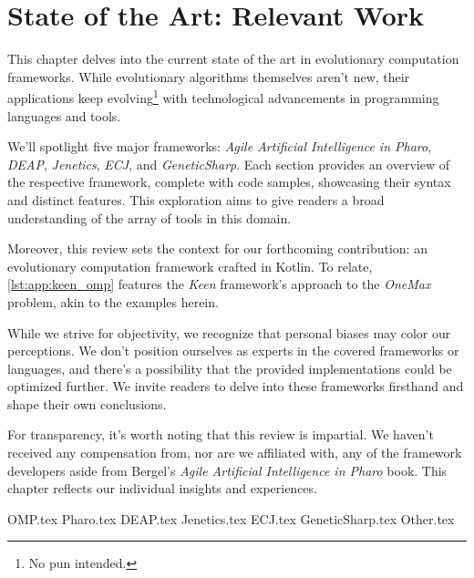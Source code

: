 \chapter{State of the Art: Relevant Work}
\label{chap:sota}
  This chapter delves into the current state of the art in evolutionary 
  computation frameworks.
  While evolutionary algorithms themselves aren't new, their applications keep 
  evolving\footnote{No pun intended.} with technological advancements in 
  programming languages and tools.

  We'll spotlight five major frameworks: \emph{Agile Artificial Intelligence in 
  Pharo}, \emph{DEAP}, \emph{Jenetics}, \emph{ECJ}, and \emph{GeneticSharp}.
  Each section provides an overview of the respective framework, complete with 
  code samples, showcasing their syntax and distinct features.
  This exploration aims to give readers a broad understanding of the array of 
  tools in this domain.

  Moreover, this review sets the context for our forthcoming contribution: an 
  evolutionary computation framework crafted in Kotlin.
  To relate, \vref{lst:app:keen_omp} features the \emph{Keen} framework's 
  approach to the \emph{OneMax} problem, akin to the examples herein.

  While we strive for objectivity, we recognize that personal biases may color 
  our perceptions.
  We don't position ourselves as experts in the covered frameworks or languages, 
  and there's a possibility that the provided implementations could be optimized 
  further.
  We invite readers to delve into these frameworks firsthand and shape their own 
  conclusions.

  For transparency, it's worth noting that this review is impartial.
  We haven't received any compensation from, nor are we affiliated with, any of 
  the framework developers aside from Bergel's \emph{Agile Artificial 
  Intelligence in Pharo} book.
  This chapter reflects our individual insights and experiences.

  {OMP.tex}
  {Pharo.tex}
  {DEAP.tex}
  {Jenetics.tex}
  {ECJ.tex}
  {GeneticSharp.tex}
  {Other.tex}
